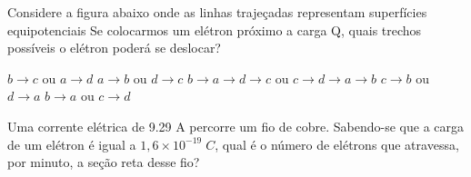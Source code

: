\documentclass[12pt, addpoints]{exam}
\begin{document}
    \begin{questions}
\begin{multicols*}{2}
\question Considere a figura abaixo onde as linhas trajeçadas representam superfícies equipotenciais Se colocarmos um elétron próximo a carga Q, quais trechos possíveis o elétron poderá se deslocar?
        
        \begin{center}
            \begin{minipage}[c]{0.5\linewidth}
            \end{minipage}
        \end{center}
        
        

\begin{choices}
\choice $b\rightarrow c$ ou $a\rightarrow d$ 
\choice $a\rightarrow b$ ou $d\rightarrow c$ 
\choice $b\rightarrow a\rightarrow d\rightarrow c$ ou $c\rightarrow d\rightarrow a\rightarrow b$ 
\choice $c\rightarrow b$ ou $d\rightarrow a$ 
\choice $b\rightarrow a$ ou $c\rightarrow d$ 
\end{choices}
\question Uma corrente elétrica de    9.29 A percorre um ﬁo de cobre. Sabendo-se que a carga de um elétron é igual a $1,6\times 10^{-19}\;C$, qual é o número de elétrons que atravessa, por minuto, a seção reta desse ﬁo?


\end{multicols*}
\end{questions}
\end{document}

